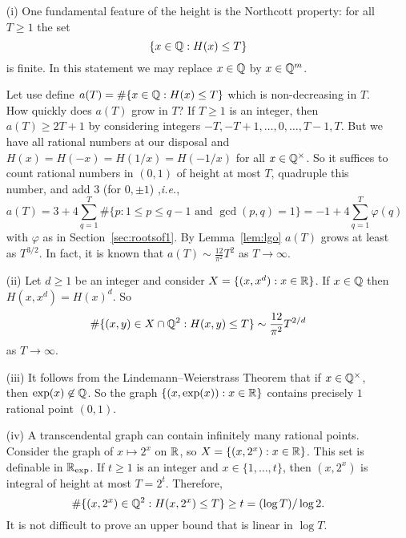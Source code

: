 \begin{example}\label{ex:heightcount1}\leavevmode
  \begin{enumerate}
  \item [(i)]
  One fundamental feature of the height is the Northcott property: for
  all $T\ge 1$ the set
  \begin{equation*}
    \{ x\in {\mathbb{Q}} : H(x)\le T\}
  \end{equation*}
  is finite. In this statement we may replace $x\in{\mathbb{Q}}$ by $x\in
  {\mathbb{Q}}^m$.

  Let use define $a(T) = \#\{x\in{\mathbb{Q}} : H(x)\le T\}$ which is
  non-decreasing in $T$. How quickly does $a(T)$ grow in $T$?
  If $T\ge 1$ is an integer, then $a(T) \ge 2T+1$ by considering
  integers
  $-T,-T+1,\ldots,0,\ldots,T-1,T$. But we have all rational numbers at
  our disposal and $H(x)=H(-x)=H(1/x)=H(-1/x)$ for all
  $x\in{\mathbb{Q}}^\times$. So it suffices to count rational numbers in
  $(0,1)$ of height at most $T$, quadruple this number, and add 3
  (for $0,\pm 1$)
  ,\textit{i.e.}, 
  \begin{equation*}
    a(T) = 3 + 4 \sum_{q=1}^T \# \{ p : 1\le p \le q-1 \text{ and
    }\gcd(p,q)=1\} = -1+4\sum_{q=1}^T \varphi(q)
  \end{equation*}
  with $\varphi$ as in Section~\ref{sec:rootsof1}. By Lemma~\ref{lem:lgo}
  $a(T)$ grows at least as $T^{3/2}$. In fact, it is known that
  $a(T)\sim \frac{12}{\pi^2} T^2$ as $T\rightarrow\infty$.


\item[(ii)] Let $d\ge 1$ be an integer and consider
  $X = \{(x,x^d) : x\in {\mathbb{R}}\}$. If $x\in{\mathbb{Q}}$ then $H(x,x^d) = H(x)^d$.
  So
  \begin{equation*}
    \#\{ (x,y) \in X\cap {\mathbb{Q}}^2 : H(x,y)\le T\} \sim
    \frac{12}{\pi^2}T^{2/d} 
  \end{equation*}
  as $T\rightarrow\infty$. 
  
  \item[(iii)] It follows from the Lindemann--Weierstrass Theorem that
    if $x\in{\mathbb{Q}}^\times$, then $\exp(x) \not\in{\mathbb{Q}}$. So the graph
    $\{(x,\exp(x)) : x\in{\mathbb{R}}\}$ contains precisely $1$ rational point
    $(0,1)$.

  \item[(iv)] A transcendental graph can contain infinitely many
    rational points. Consider the graph of $x\mapsto 2^x$ on ${\mathbb{R}}$, so 
    $X=\{(x,2^x) : x \in{\mathbb{R}}\}$. This set is definable in ${{\mathbb{R}}_{\mathrm{exp}}}$.
    If $t\ge 1$ is an integer and $x\in \{1,\ldots,t\}$, then
    $(x,2^x)$ is integral of height at most $T=2^t$. Therefore,
    \begin{equation*}
      \# \{(x,2^x)\in{\mathbb{Q}}^2 : H(x,2^x)\le T\} \ge t= (\log T)/\log 2.
    \end{equation*}
    It is not difficult to prove an upper bound that is linear in
    $\log T$. 
\end{enumerate}
\end{example}

